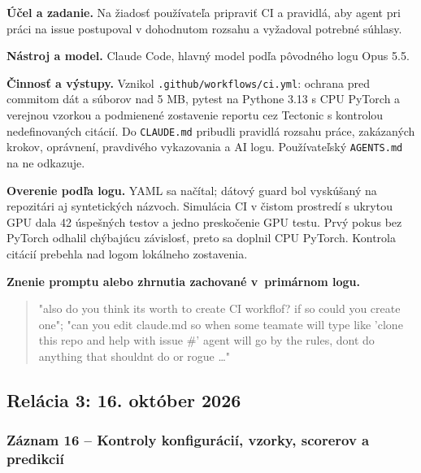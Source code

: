 \par\noindent \textbf{Účel a zadanie.} Na žiadosť používateľa pripraviť CI a pravidlá, aby agent pri práci na issue postupoval v dohodnutom rozsahu a vyžadoval potrebné súhlasy.\par\smallskip
\par\noindent \textbf{Nástroj a model.} Claude Code, hlavný model podľa pôvodného logu Opus 5.5.\par\smallskip
\par\noindent \textbf{Činnosť a výstupy.} Vznikol \texttt{.\allowbreak{}github/\allowbreak{}workflows/\allowbreak{}ci.\allowbreak{}yml}: ochrana pred commitom dát a súborov nad 5 MB, pytest na Pythone 3.13 s CPU PyTorch a verejnou vzorkou a podmienené zostavenie reportu cez Tectonic s kontrolou nedefinovaných citácií. Do \texttt{CLAUDE.\allowbreak{}md} pribudli pravidlá rozsahu práce, zakázaných krokov, oprávnení, pravdivého vykazovania a AI logu. Používateľský \texttt{AGENTS.\allowbreak{}md} na ne odkazuje.\par\smallskip
\par\noindent \textbf{Overenie podľa logu.} YAML sa načítal; dátový guard bol vyskúšaný na repozitári aj syntetických názvoch. Simulácia CI v čistom prostredí s ukrytou GPU dala 42 úspešných testov a jedno preskočenie GPU testu. Prvý pokus bez PyTorch odhalil chýbajúcu závislosť, preto sa doplnil CPU PyTorch. Kontrola citácií prebehla nad logom lokálneho zostavenia.\par\smallskip

\par\noindent\textbf{Znenie promptu alebo zhrnutia zachované v~primárnom logu.}

\begin{quote}\normalsize "also do you think its worth to create CI workflof? if so could you create one"; "can you edit claude.md so when some teamate will type like 'clone this repo and help with issue \#' agent will go by the rules, dont do anything that shouldnt do or rogue …"\end{quote}

\subsection*{Relácia 3: 16. október 2026}

\subsubsection*{Záznam 16 -- Kontroly konfigurácií, vzorky, scorerov a predikcií}


